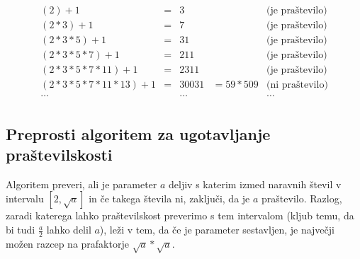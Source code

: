 \documentclass[10pt,a4paper,oneside]{book}
\begin{document}
\[\begin{array}{ccccc}
(2)+1 &=& 3& &\mbox{(je praštevilo)}\\
(2*3)+1 &=& 7& &\mbox{(je praštevilo)}\\
(2*3*5)+1 &=& 31& &\mbox{(je praštevilo)}\\
(2*3*5*7)+1 &=& 211& &\mbox{(je praštevilo)}\\
(2*3*5*7*11)+1 &=& 2311& &\mbox{(je praštevilo)}\\
(2*3*5*7*11*13)+1 &=& 30031 &= 59*509 &\mbox{(ni praštevilo)}\\
\dots & & \dots& & \dots \\
\end{array}\]
\subsection{Preprosti algoritem za ugotavljanje praštevilskosti} 
Algoritem preveri, ali je parameter $a$ deljiv s katerim izmed naravnih števil v intervalu $\left[2, \sqrt{a}\right]$ in če takega števila ni, zaključi, da je $a$ praštevilo. Razlog, zaradi katerega lahko praštevilskost preverimo s tem intervalom (kljub temu, da bi tudi $\frac{a}{2}$ lahko delil $a$), leži v tem, da če je parameter sestavljen, je največji možen razcep na prafaktorje $\sqrt{a}*\sqrt{a}$.

\end{document}
